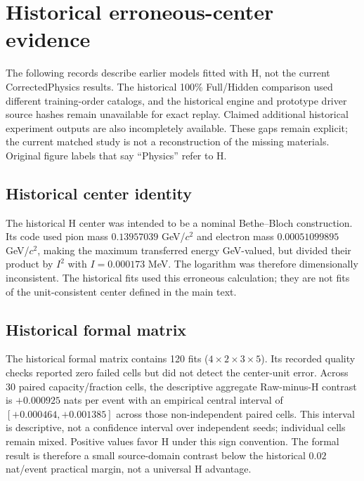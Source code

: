 \documentclass[11pt]{article}
\begin{document}
\clearpage


\clearpage
\section{Historical erroneous-center evidence}
\label{app:historical}

The following records describe earlier models fitted with H, not the current
CorrectedPhysics results. The historical 100\% Full/Hidden comparison used
different training-order catalogs, and the historical engine and prototype
driver source hashes remain unavailable for exact replay. Claimed additional
historical experiment outputs are also incompletely available. These gaps
remain explicit; the current matched study is not a reconstruction of the
missing materials. Original figure labels that say ``Physics'' refer to H.

\subsection{Historical center identity}

The historical H center was intended to be a nominal Bethe--Bloch
construction. Its code used pion mass $0.13957039$ GeV/$c^2$ and electron mass
$0.00051099895$ GeV/$c^2$, making the maximum transferred energy GeV-valued,
but divided their product by $I^2$ with $I=0.000173$ MeV. The logarithm was
therefore dimensionally inconsistent. The historical fits used this erroneous
calculation; they are not fits of the unit-consistent center defined in the main text.



\subsection{Historical formal matrix}

The historical formal matrix contains 120 fits ($4\times2\times3\times5$).
Its recorded quality checks reported zero failed cells but did not detect the
center-unit error. Across 30 paired capacity/fraction cells,
the descriptive aggregate Raw-minus-H contrast is $+0.000925$ nats per
event with an empirical central interval of $[+0.000464,+0.001385]$ across
those non-independent paired cells. This interval is descriptive, not a
confidence interval over independent seeds; individual cells remain mixed.
Positive values favor H under this sign convention. The formal result is
therefore a small source-domain contrast below the historical $0.02$ nat/event practical margin, not a
universal H advantage.
\end{document}
